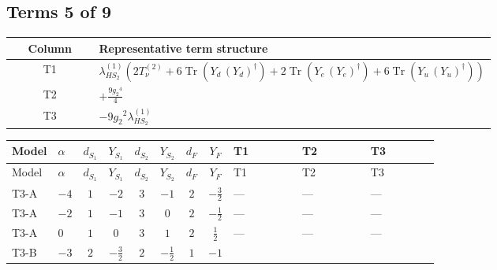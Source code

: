 \documentclass[8pt]{article}
\begin{document}
\begin{landscape}
\subsection*{Terms 5 of 9}
\begin{center}
\begin{tabular}{@{}c >{\raggedright\arraybackslash}p{0.82\linewidth}@{}}
\toprule
Column & Representative term structure \\
\midrule
T1 & \(\displaystyle {\lambda_{HS_2}^{(1)}} (2 T_{\nu}^{(2)}+6 \operatorname{Tr}\!\left({Y_d}\,\left({Y_d}\right)^{\dagger}\right)+2 \operatorname{Tr}\!\left({Y_e}\,\left({Y_e}\right)^{\dagger}\right)+6 \operatorname{Tr}\!\left({Y_u}\,\left({Y_u}\right)^{\dagger}\right))\) \\
\midrule
T2 & \(\displaystyle +\frac{9 {g_2}^4}{4}\) \\
\midrule
T3 & \(\displaystyle -9 {g_2}^2 {\lambda_{HS_2}^{(1)}}\) \\
\midrule
\bottomrule
\end{tabular}
\end{center}
\smallskip
\tiny
\begin{longtable}{@{}llcccccc >{\raggedright\arraybackslash}p{0.21\linewidth} >{\raggedright\arraybackslash}p{0.21\linewidth} >{\raggedright\arraybackslash}p{0.21\linewidth}@{}}
\toprule
Model & $\alpha$ & $d_{S_1}$ & $Y_{S_1}$ & $d_{S_2}$ & $Y_{S_2}$ & $d_F$ & $Y_F$ & T1 & T2 & T3 \\
\midrule
\endfirsthead
\toprule
Model & $\alpha$ & $d_{S_1}$ & $Y_{S_1}$ & $d_{S_2}$ & $Y_{S_2}$ & $d_F$ & $Y_F$ & T1 & T2 & T3 \\
\midrule
\endhead
T3-A & $-4$ & $1$ & $-2$ & $3$ & $-1$ & $2$ & $-\frac{3}{2}$ & --- & --- & --- \\
\midrule
T3-A & $-2$ & $1$ & $-1$ & $3$ & $0$ & $2$ & $-\frac{1}{2}$ & --- & --- & --- \\
\midrule
T3-A & $0$ & $1$ & $0$ & $3$ & $1$ & $2$ & $\frac{1}{2}$ & --- & --- & --- \\
\midrule
T3-B & $-3$ & $2$ & $-\frac{3}{2}$ & $2$ & $-\frac{1}{2}$ & $1$ & $-1$ & \scriptsize\adjustbox{max width=\linewidth}{$\begin{gathered} {\lambda_{HS_2}^{(1)}} (2 T_{\nu}^{(2)}+6 \operatorname{Tr}\!\left({Y_d}\,\left({Y_d}\right)^{\dagger}\right)+2 \operatorname{Tr}\!\left({Y_e}\,\left({Y_e}\right)^{\dagger}\right)+6 \operatorname{Tr}\!\left({Y_u}\,\left({Y_u}\right)^{\dagger}\right))\end{gathered}$} & \scriptsize\adjustbox{max width=\linewidth}{$\begin{gathered} +\frac{9 {g_2}^4}{4}\end{gathered}$} & \scriptsize\adjustbox{max width=\linewidth}{$\begin{gathered} -9 {g_2}^2 {\lambda_{HS_2}^{(1)}}\end{gathered}$} \\

\end{longtable}
\end{landscape}
\end{document}
